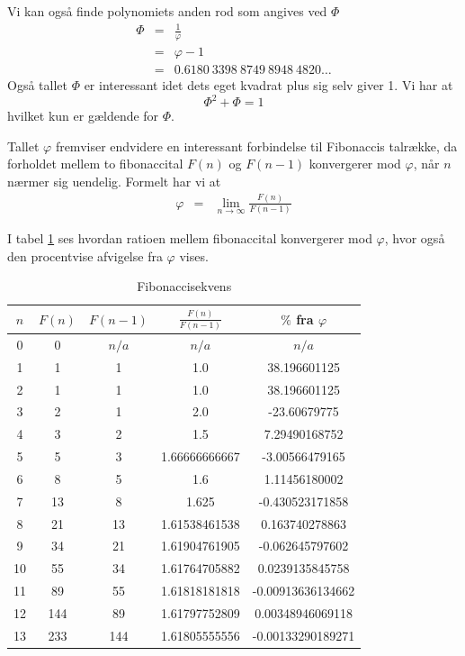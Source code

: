 {Vi kan også finde polynomiets anden rod som angives ved $\varPhi$
\begin{eqnarray*}
	\varPhi & = & \frac{1}{\varphi} \\
		& = & \varphi - 1 \\
		& = & 0.6180\ 3398\ 8749\ 8948\ 4820 \dots
\end{eqnarray*}
Også tallet $\varPhi$ er interessant idet dets eget kvadrat plus sig
selv giver 1. Vi har at
\begin{equation}
	\varPhi^{2} + \varPhi = 1
	\label{Phi_squared}
\end{equation}
hvilket kun er gældende for $\varPhi$.

Tallet $\varphi$ fremviser endvidere en interessant forbindelse til
Fibonaccis talrække, da forholdet mellem to fibonaccital $F(n)$ og $F(n
- 1)$ konvergerer mod $\varphi$, når $n$ nærmer sig uendelig. Formelt har
vi at
\begin{eqnarray*}
	\varphi & =     & \lim_{n \rightarrow\infty}{\frac{F(n)}{F(n - 1)}}
\end{eqnarray*}

I tabel \ref{fibonacci_sequence} ses hvordan ratioen mellem fibonaccital
konvergerer mod $\varphi$, hvor også den procentvise afvigelse fra
$\varphi$ vises.

\begin{table}[h!]
    \centering
    \begin{tabular}{|c|c|c|c|c|}
        \hline
        $n$ & $F(n)$ & $F(n - 1)$ & $ \frac{F(n)}{F(n - 1)}$ & $\%$ fra $\varphi$ \\
        \hline
        0	 & 0 	 & $n/a$ & $n/a$ 		& $n/a$ 		\\
        1	 & 1	 & 1	 & 1.0		 	& 38.196601125 		\\
        2	 & 1	 & 1	 & 1.0		 	& 38.196601125 		\\
        3	 & 2	 & 1	 & 2.0		 	& -23.60679775 		\\
        4	 & 3	 & 2	 & 1.5			& 7.29490168752 	\\
        5	 & 5	 & 3	 & 1.66666666667	& -3.00566479165 	\\
        6	 & 8	 & 5	 & 1.6			& 1.11456180002 	\\
        7	 & 13	 & 8	 & 1.625	 	& -0.430523171858 	\\
        8	 & 21	 & 13	 & 1.61538461538	& 0.163740278863 	\\
        9	 & 34	 & 21	 & 1.61904761905	& -0.062645797602 	\\
        10	 & 55	 & 34	 & 1.61764705882	& 0.0239135845758 	\\
        11	 & 89	 & 55	 & 1.61818181818	& -0.00913636134662 	\\
        12	 & 144	 & 89	 & 1.61797752809	& 0.00348946069118 	\\
        13	 & 233	 & 144	 & 1.61805555556	& -0.00133290189271 	\\
        \hline
    \end{tabular}
    \caption{Fibonaccisekvens}
    \label{fibonacci_sequence}
\end{table}

}

